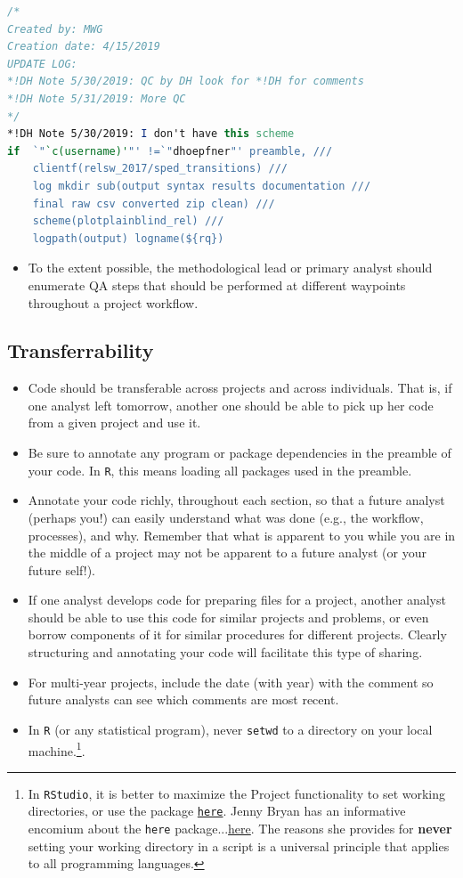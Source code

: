 \begin{lstlisting}[language=Stata, numbers=none]
/*
Created by: MWG
Creation date: 4/15/2019
UPDATE LOG:
*!DH Note 5/30/2019: QC by DH look for *!DH for comments
*!DH Note 5/31/2019: More QC
*/
*!DH Note 5/30/2019: I don't have this scheme
if  `"`c(username)'"' !=`"dhoepfner"' preamble, ///
	clientf(relsw_2017/sped_transitions) ///
	log mkdir sub(output syntax results documentation ///
	final raw csv converted zip clean) ///
	scheme(plotplainblind_rel) ///
	logpath(output) logname(${rq})

\end{lstlisting}

\begin{itemize}

	\item To the extent possible, the methodological lead or primary analyst should enumerate QA steps that should be performed at different waypoints throughout a project workflow.
\end{itemize}

\subsection{Transferrability}
\begin{itemize}
	\item Code should be transferable across projects and across individuals. That is, if one analyst left tomorrow, another one should be able to pick up her code from a given project and use it.
	\item Be sure to annotate any program or package dependencies in the preamble of your code. In \texttt{R}, this means loading all packages used in the preamble.
	\item Annotate your code richly, throughout each section, so that a future analyst (perhaps you!) can easily understand what was done (e.g., the workflow, processes), and why. Remember that what is apparent to you while you are in the middle of a project may not be apparent to a future analyst (or your future self!).
	\item If one analyst develops code for preparing files for a project, another analyst should be able to use this code for similar projects and problems, or even borrow components of it for similar procedures for different projects. Clearly structuring and annotating your code will facilitate this type of sharing.
	\item For multi-year projects, include the date (with year) with the comment so future analysts can see which comments are most recent.
	\item In \texttt{R} (or any statistical program), never \texttt{setwd} to a directory on your local machine.\footnote{In \texttt{RStudio}, it is better to maximize the Project functionality to set working directories, or use the package \href{https://here.r-lib.org/}{\texttt{here}}. Jenny Bryan has an informative encomium about the \texttt{here} package...\href{https://github.com/jennybc/here_here}{here}. The reasons she provides for \textbf{never} setting your working directory in a script is a universal principle that applies to all programming languages.}.
\end{itemize}

